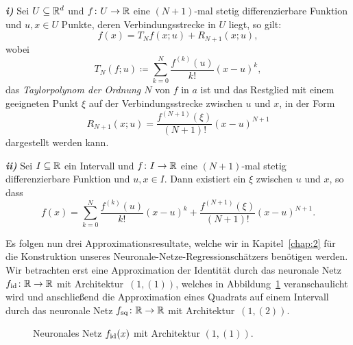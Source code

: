 \begin{lem}
\label{lem:lagrange}

\textbf{\emph{i)}} Sei $U \subseteq \mathbb{R}^d$ und $f\colon U \to \mathbb{R}$ eine $(N + 1)$-mal stetig differenzierbare Funktion und $u, x \in U$ Punkte, deren Verbindungsstrecke in $U$ liegt, so gilt:
$$ f(x) = T_Nf(x;u) + R_{N + 1}(x;u),$$
wobei
$$
T_N(f;u) \coloneqq \sum_{k = 0}^N \frac{f^{(k)}(u)}{k!} (x - u)^k,
$$
das \emph{Taylorpolynom der Ordnung $N$} von $f$ in $a$ ist und das Restglied mit einem geeigneten Punkt $\xi$ auf der Verbindungsstrecke zwischen $u$ und $x$, in der Form 
$$ R_{N + 1}(x;u) = \frac{f^{(N + 1)}(\xi)}{(N + 1)!} (x - u)^{N + 1}$$
dargestellt werden kann.

\textbf{\emph{ii)}} Sei $I \subseteq \mathbb{R}$ ein Intervall und $f \colon I \to \mathbb{R}$ eine $(N + 1)$-mal stetig differenzierbare Funktion und $u, x \in I$. Dann existiert ein $\xi$ zwischen $u$ und $x$, so dass $$f(x) = \sum_{k = 0}^N \frac{f^{(k)}(u)}{k!}(x - u)^k + \frac{f^{(N + 1)}(\xi)}{(N + 1)!}(x - u)^{N + 1}.$$
\end{lem}
Es folgen nun drei Approximationsresultate, welche wir in Kapitel~\ref{chap:2} für die Konstruktion unseres Neuronale-Netze-Regressionschätzers benötigen werden.
Wir betrachten erst eine Approximation der Identität durch das neuronale Netz $f_{\mathrm{id}}\colon \mathbb{R} \to \mathbb{R}$ mit Architektur~$(1,(1))$, welches in Abbildung~\ref{fig:fid} veranschaulicht wird und anschließend die Approximation eines Quadrats auf einem Intervall durch das neuronale Netz $f_{\mathrm{sq}}\colon \mathbb{R} \to \mathbb{R}$ mit Architektur~$(1,(2))$.
\begin{figure}[htp]
\centering
{}

\caption{Neuronales Netz $f_{\mathrm{id}}(x)$ mit Architektur $(1,(1))$.}
\label{fig:fid}
\end{figure}
 
